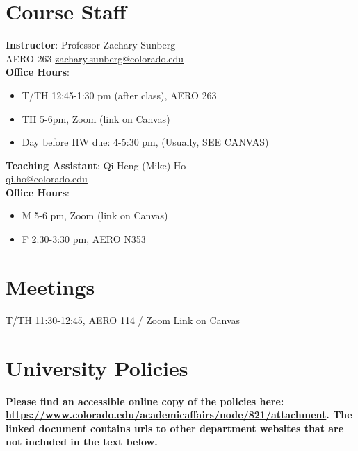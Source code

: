 \documentclass[9pt]{article}
\begin{document}
\section*{Course Staff}

\begin{multicols}{2}
    \begin{minipage}{\columnwidth}
        \textbf{Instructor}: Professor Zachary Sunberg\\
        AERO 263 \href{mailto://zachary.sunberg@colorado.edu}{zachary.sunberg@colorado.edu}\\
        \textbf{Office Hours}:
        \begin{itemize}[nosep]
            \item T/TH 12:45-1:30 pm (after class), AERO 263
            \item TH 5-6pm, Zoom (link on Canvas)
            \item Day before HW due: 4-5:30 pm, (Usually, SEE CANVAS)
        \end{itemize}
    \end{minipage}

    \begin{minipage}{\columnwidth}
        \textbf{Teaching Assistant}: Qi Heng (Mike) Ho\\
        \href{mailto://qi.ho@colorado.edu}{qi.ho@colorado.edu}\\
        \textbf{Office Hours}:
        \begin{itemize}[nosep]
            \item M 5-6 pm, Zoom (link on Canvas)
            \item F 2:30-3:30 pm, AERO N353
        \end{itemize}
    \end{minipage}
\end{multicols}

\section*{Meetings}

T/TH 11:30-12:45, AERO 114 / Zoom Link on Canvas

\section*{University Policies}

\textbf{Please find an accessible online copy of the policies here: \url{https://www.colorado.edu/academicaffairs/node/821/attachment}. The linked document contains urls to other department websites that are not included in the text below.}
\end{document}
